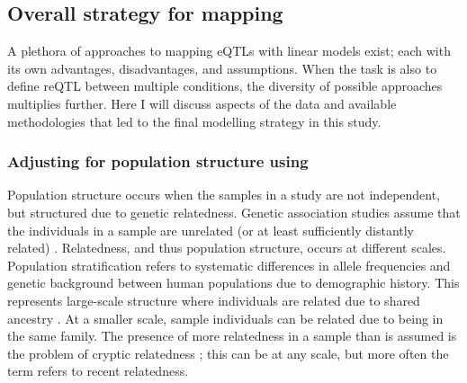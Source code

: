 \subsection{Overall strategy for  mapping}
\label{subsec:hird_reQTL_overall_strategy}

A plethora of approaches to mapping \glspl{eQTL} with linear models exist; each with its own advantages, disadvantages, and assumptions.
When the task is also to define \gls{reQTL} between multiple conditions, the diversity of possible approaches multiplies further.
Here I will discuss aspects of the data and available methodologies that led to the final modelling strategy in this study.

\subsubsection{Adjusting for population structure using }

Population structure occurs when the samples in a study are not independent, but structured due to genetic relatedness.
Genetic association studies assume that the individuals in a sample are unrelated (or at least sufficiently distantly related) \autocite{astle2009PopulationStructureCryptic,sillanpaa2011OverviewTechniquesAccount,sul2018PopulationStructureGenetic}.
Relatedness, and thus population structure, occurs at different scales.
Population stratification refers to systematic differences in allele frequencies and genetic background between human populations due to demographic history.
This represents large-scale structure where individuals are related due to shared ancestry \autocite{price2010NewApproachesPopulation,sillanpaa2011OverviewTechniquesAccount}.
At a smaller scale, sample individuals can be related due to being in the same family.
The presence of more relatedness in a sample than is assumed is the problem of cryptic relatedness \autocite{astle2009PopulationStructureCryptic,sillanpaa2011OverviewTechniquesAccount,sul2018PopulationStructureGenetic};
this can be at any scale, but more often the term refers to recent relatedness.

